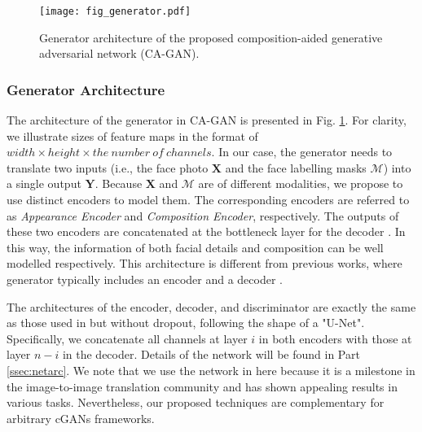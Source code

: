 \documentclass[journal]{IEEEtran}
\begin{document}
\begin{figure}
\begin{center}
\texttt{[image: fig\_generator.pdf]}
\end{center}
   \vspace{-0.4cm}
   \caption{Generator architecture of the proposed composition-aided generative adversarial network (CA-GAN).}
\label{fig:cagan}
   \vspace{-0.4cm}
\end{figure}









\subsubsection{Generator Architecture}
\label{sec:garc}

The architecture of the generator in CA-GAN is presented in Fig. \ref{fig:cagan}. For clarity, we illustrate  sizes of feature maps in the format of $width \times height \times the~number~of~channels$. 
In our case, the generator needs to translate two inputs (i.e., the face photo $\mathbf{X}$ and the face labelling masks $\mathcal{M}$) into a single output $\mathbf{Y}$.
Because $\mathbf{X}$ and $\mathcal{M}$ are of different modalities, we propose to use distinct encoders to model them. The corresponding encoders are referred to as \textit{Appearance Encoder} and  \textit{Composition Encoder}, respectively.
The outputs of these two encoders are concatenated at the bottleneck layer for the decoder \cite{Yan2017Skeleton}. In this way, the information of both facial details and composition can be well modelled respectively.
This architecture is different from previous works, where generator typically includes an encoder and a decoder \cite{Isola2017Pix2Pix, Zhu2017CycleGAN, Zhang2017StackGAN}.


The architectures of the encoder, decoder, and discriminator are exactly the same as those used in \cite{Isola2017Pix2Pix} but without dropout, following the shape of a "U-Net". Specifically, we concatenate all channels at layer $i$ in both encoders with those at layer $n-i$ in the decoder. Details of the network will be found in Part \ref{ssec:netarc}. We note that we use the network in \cite{Isola2017Pix2Pix} here because it is a milestone in the image-to-image translation community and has shown appealing results in various tasks. Nevertheless, our proposed techniques are complementary for arbitrary cGANs frameworks. 
\end{document}

